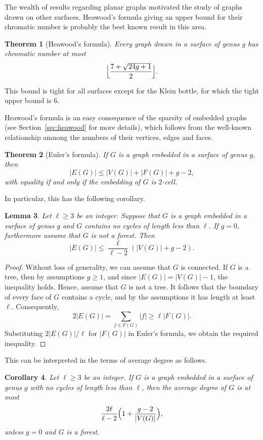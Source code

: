 \documentclass[12pt,twoside,openright,a4paper]{book}
\newtheorem{theorem}{Theorem}[chapter]
\newtheorem{lemma}[theorem]{Lemma}
\newtheorem{corollary}[theorem]{Corollary}
\begin{document}
The wealth of results regarding planar graphs motivated the study of graphs drawn on other surfaces.
Heawood's formula giving an upper bound for their chromatic number is probably the best known result in this area.
\begin{theorem}[Heawood's formula]\label{thm:heawood}
Every graph drawn in a surface of genus $g$ has chromatic number at most
$$\Bigl\lfloor\frac{7+\sqrt{24g+1}}{2}\Bigr\rfloor.$$
\end{theorem}
This bound is tight for all surfaces except for the Klein bottle, for which the tight upper bound is $6$.

Heawood's formula is an easy consequence of the sparsity of embedded graphs (see Section~\ref{sec:heawood}
for more details), which follows from the well-known relationship amnong the numbers of their vertices, edges and faces.

\begin{theorem}[Euler's formula]\label{thm:eulerfla}
If $G$ is a graph embedded in a surface of genus $g$, then
$$|E(G)|\le |V(G)|+|F(G)|+g-2,$$
with equality if and only if the embedding of $G$ is $2$-cell.
\end{theorem}

In particular, this has the following corollary.
\begin{lemma}\label{lemma:numedges}
Let $\ell\ge 3$ be an integer.
Suppose that $G$ is a graph embedded in a surface of genus $g$ and $G$ contains no cycles of length less than $\ell$.
If $g=0$, furthermore assume that $G$ is not a forest. Then
$$|E(G)|\le \frac{\ell}{\ell-2}(|V(G)|+g-2).$$
\end{lemma}
\begin{proof}
Without loss of generality, we can assume that $G$ is connected.  If $G$ is a tree, then by assumptions
$g\ge 1$, and since $|E(G)|=|V(G)|-1$, the inequality holds.
Hence, assume that $G$ is not a tree.  It follows that the boundary
of every face of $G$ contains a cycle, and by the assumptions it has length at least $\ell$.
Consequently,
$$2|E(G)|=\sum_{f\in F(G)} |f|\ge \ell|F(G)|.$$
Substituting $2|E(G)|/\ell$ for $|F(G)|$ in Euler's formula, we obtain the required inequality.
\end{proof}

This can be interpreted in the terms of average degree as follows.
\begin{corollary}\label{cor:mad}
Let $\ell\ge 3$ be an integer.
If $G$ is a graph embedded in a surface of genus $g$ with no cycles of length less than $\ell$,
then the average degree of $G$ is at most
$$\frac{2\ell}{\ell-2}\Bigl(1+\frac{g-2}{|V(G)|}\Bigr),$$
unless $g=0$ and $G$ is a forest.
\end{corollary}
\end{document}
